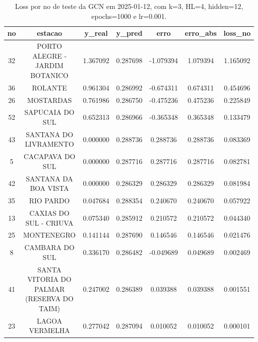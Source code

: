 \begin{table}[h]
\centering
\caption{Loss por no de teste da GCN em 2025-01-12, com k=3, HL=4, hidden=12, epochs=1000 e lr=0.001.}
\label{tab:gcn_loss_k3_hl4_h12_e1000_d20250112}
\begin{tabular}{ccccccc}
\toprule
no & estacao & y\_real & y\_pred & erro & erro\_abs & loss\_no \\
\midrule
32 & PORTO ALEGRE - JARDIM BOTANICO & 1.367092 & 0.287698 & -1.079394 & 1.079394 & 1.165092 \\
36 & ROLANTE & 0.961304 & 0.286992 & -0.674311 & 0.674311 & 0.454696 \\
26 & MOSTARDAS & 0.761986 & 0.286750 & -0.475236 & 0.475236 & 0.225849 \\
52 & SAPUCAIA DO SUL & 0.652313 & 0.286966 & -0.365348 & 0.365348 & 0.133479 \\
43 & SANTANA DO LIVRAMENTO & 0.000000 & 0.288736 & 0.288736 & 0.288736 & 0.083369 \\
5 & CACAPAVA DO SUL & 0.000000 & 0.287716 & 0.287716 & 0.287716 & 0.082781 \\
42 & SANTANA DA BOA VISTA & 0.000000 & 0.286329 & 0.286329 & 0.286329 & 0.081984 \\
35 & RIO PARDO & 0.047684 & 0.288354 & 0.240670 & 0.240670 & 0.057922 \\
13 & CAXIAS DO SUL - CRIUVA & 0.075340 & 0.285912 & 0.210572 & 0.210572 & 0.044340 \\
25 & MONTENEGRO & 0.141144 & 0.287690 & 0.146546 & 0.146546 & 0.021476 \\
8 & CAMBARA DO SUL & 0.336170 & 0.286482 & -0.049689 & 0.049689 & 0.002469 \\
41 & SANTA VITORIA DO PALMAR (RESERVA DO TAIM) & 0.247002 & 0.286389 & 0.039388 & 0.039388 & 0.001551 \\
23 & LAGOA VERMELHA & 0.277042 & 0.287094 & 0.010052 & 0.010052 & 0.000101 \\
\bottomrule
\end{tabular}
\end{table}
